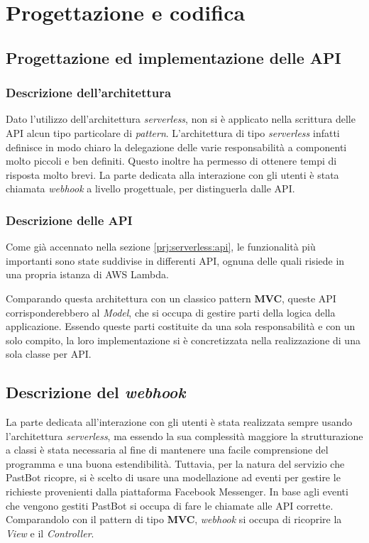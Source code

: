 
\chapter{Progettazione e codifica}

\section{Progettazione ed implementazione delle API}

\subsection{Descrizione dell'architettura}

Dato l'utilizzo dell'architettura \textit{serverless}, non si è applicato nella
scrittura delle API alcun tipo particolare di \textit{pattern}. L'architettura
di tipo \textit{serverless} infatti definisce in modo chiaro la delegazione
delle varie responsabilità a componenti molto piccoli e ben definiti. Questo
inoltre ha permesso di ottenere tempi di risposta molto brevi.
La parte dedicata alla interazione con gli utenti è stata chiamata
\textit{webhook} a livello progettuale, per distinguerla dalle API.

\subsection{Descrizione delle API}
Come già accennato nella sezione \ref{prj:serverless:api}, le funzionalità più
importanti sono state suddivise in differenti API, ognuna delle quali risiede
in una propria istanza di AWS Lambda.

Comparando questa architettura con un classico pattern \textbf{MVC}, queste API
corrisponderebbero al \textit{Model}, che si occupa di gestire parti della
logica della applicazione. Essendo queste parti costituite da una sola
responsabilità e con un solo compito, la loro implementazione si è
concretizzata nella realizzazione di una sola classe per API.

\section{Descrizione del \textit{webhook}}
La parte dedicata all'interazione con gli utenti è stata realizzata sempre
usando l'architettura \textit{serverless}, ma essendo la sua complessità
maggiore la strutturazione a classi è stata necessaria al fine di mantenere una
facile comprensione del programma e una buona estendibilità. Tuttavia, per la
natura del servizio che PastBot ricopre, si è scelto di usare una modellazione
ad eventi per gestire le richieste provenienti dalla piattaforma Facebook
Messenger. In base agli eventi che vengono gestiti PastBot si occupa di fare le
chiamate alle API corrette. Comparandolo con il pattern di tipo \textbf{MVC},
\textit{webhook} si occupa di ricoprire la \textit{View} e il
\textit{Controller}.


